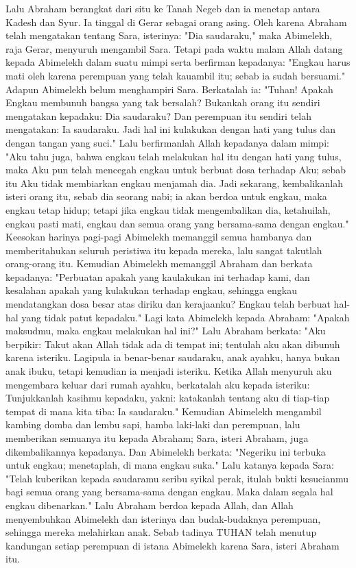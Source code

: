 \begin{biblechapter} %
 Lalu Abraham berangkat dari situ ke Tanah Negeb dan ia menetap antara Kadesh dan Syur. Ia tinggal di Gerar sebagai orang asing.
\verse Oleh karena Abraham telah mengatakan tentang Sara, isterinya: "Dia saudaraku," maka Abimelekh, raja Gerar, menyuruh mengambil Sara.
\verse Tetapi pada waktu malam Allah datang kepada Abimelekh dalam suatu mimpi serta berfirman kepadanya: "Engkau harus mati oleh karena perempuan yang telah kauambil itu; sebab ia sudah bersuami."
\verse Adapun Abimelekh belum menghampiri Sara. Berkatalah ia: "Tuhan! Apakah Engkau membunuh bangsa yang tak bersalah?
\verse Bukankah orang itu sendiri mengatakan kepadaku: Dia saudaraku? Dan perempuan itu sendiri telah mengatakan: Ia saudaraku. Jadi hal ini kulakukan dengan hati yang tulus dan dengan tangan yang suci."
\verse Lalu berfirmanlah Allah kepadanya dalam mimpi: "Aku tahu juga, bahwa engkau telah melakukan hal itu dengan hati yang tulus, maka Aku pun telah mencegah engkau untuk berbuat dosa terhadap Aku; sebab itu Aku tidak membiarkan engkau menjamah dia.
\verse Jadi sekarang, kembalikanlah isteri orang itu, sebab dia seorang nabi; ia akan berdoa untuk engkau, maka engkau tetap hidup; tetapi jika engkau tidak mengembalikan dia, ketahuilah, engkau pasti mati, engkau dan semua orang yang bersama-sama dengan engkau."
\verse Keesokan harinya pagi-pagi Abimelekh memanggil semua hambanya dan memberitahukan seluruh peristiwa itu kepada mereka, lalu sangat takutlah orang-orang itu.
\verse Kemudian Abimelekh memanggil Abraham dan berkata kepadanya: "Perbuatan apakah yang kaulakukan ini terhadap kami, dan kesalahan apakah yang kulakukan terhadap engkau, sehingga engkau mendatangkan dosa besar atas diriku dan kerajaanku? Engkau telah berbuat hal-hal yang tidak patut kepadaku."
\verse Lagi kata Abimelekh kepada Abraham: "Apakah maksudmu, maka engkau melakukan hal ini?"
\verse Lalu Abraham berkata: "Aku berpikir: Takut akan Allah tidak ada di tempat ini; tentulah aku akan dibunuh karena isteriku.
\verse Lagipula ia benar-benar saudaraku, anak ayahku, hanya bukan anak ibuku, tetapi kemudian ia menjadi isteriku.
\verse Ketika Allah menyuruh aku mengembara keluar dari rumah ayahku, berkatalah aku kepada isteriku: Tunjukkanlah kasihmu kepadaku, yakni: katakanlah tentang aku di tiap-tiap tempat di mana kita tiba: Ia saudaraku."
\verse Kemudian Abimelekh mengambil kambing domba dan lembu sapi, hamba laki-laki dan perempuan, lalu memberikan semuanya itu kepada Abraham; Sara, isteri Abraham, juga dikembalikannya kepadanya.
\verse Dan Abimelekh berkata: "Negeriku ini terbuka untuk engkau; menetaplah, di mana engkau suka."
\verse Lalu katanya kepada Sara: "Telah kuberikan kepada saudaramu seribu syikal perak, itulah bukti kesucianmu bagi semua orang yang bersama-sama dengan engkau. Maka dalam segala hal engkau dibenarkan."
\verse Lalu Abraham berdoa kepada Allah, dan Allah menyembuhkan Abimelekh dan isterinya dan budak-budaknya perempuan, sehingga mereka melahirkan anak.
\verse Sebab tadinya TUHAN telah menutup kandungan setiap perempuan di istana Abimelekh karena Sara, isteri Abraham itu.
\end{biblechapter}

